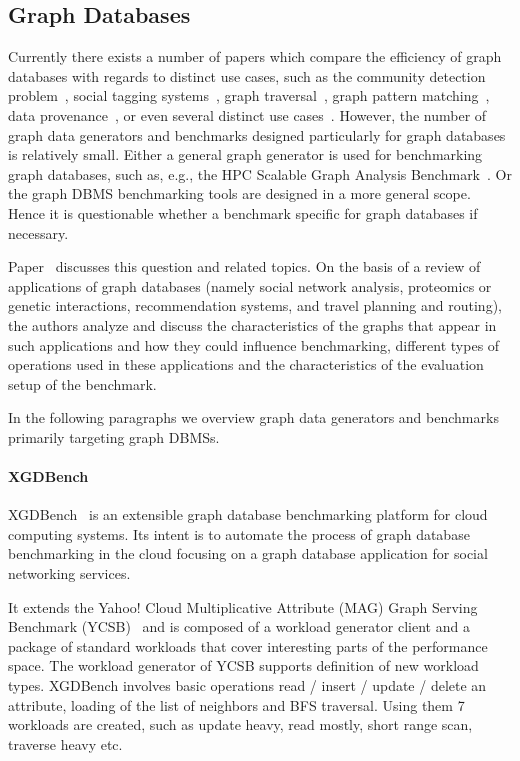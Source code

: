 \subsection{Graph Databases}
\label{sec:generators_GraphDatabases}

Currently there exists a number  of papers which compare the efficiency of graph databases with regards to distinct use cases, such as  the community detection problem~\cite{Beis2015}, social tagging systems~\cite{Giatsoglou2011}, graph traversal~\cite{Ciglan:2012:BTO:2374486.2375242}, graph pattern matching~\cite{Pobiedina2014}, data provenance~\cite{Vicknair:2010:CGD:1900008.1900067}, or even several distinct use cases~\cite{Grossniklaus2013Towar-24253}. However, the number of graph data generators and benchmarks designed particularly for graph databases is relatively small. Either a general graph generator is used for benchmarking graph databases, such as, e.g., the HPC Scalable Graph Analysis Benchmark~\cite{Dominguez-Sal:2010:SGD:1927585.1927590}. Or the graph DBMS benchmarking tools are designed in a more general scope. Hence it is questionable whether a benchmark specific for graph databases if necessary.

Paper~\cite{Dominguez-Sal:2010:DDG:1946050.1946053} discusses this question and related topics. On the basis of a review of applications of graph databases (namely social network analysis, proteomics or genetic interactions, recommendation systems, and travel planning and routing), the authors analyze and discuss the characteristics of the graphs that appear in such applications and how they could influence benchmarking, different types of operations used in these applications and the characteristics of the evaluation setup of the benchmark.

In the following paragraphs we overview graph data generators and benchmarks primarily targeting graph DBMSs.


\paragraph{XGDBench} XGDBench~\cite{Dayarathna:2014:GDB:2676904.2676939} is an extensible graph database benchmarking platform for cloud computing systems. Its intent is to automate
the process of graph database benchmarking in the cloud focusing on a graph database application for social networking services.

It extends the Yahoo! Cloud Multiplicative Attribute (MAG) Graph Serving Benchmark (YCSB)~\cite{Cooper:2010:BCS:1807128.1807152} and is composed of a workload generator client and a package of standard workloads that cover interesting parts of the performance space. 
The workload generator of YCSB supports definition of new workload types. XGDBench involves basic operations read / insert / update / delete an attribute, loading of the list of neighbors and BFS traversal. Using them 7 workloads are created, such as update heavy, read mostly, short range scan, traverse heavy etc.

